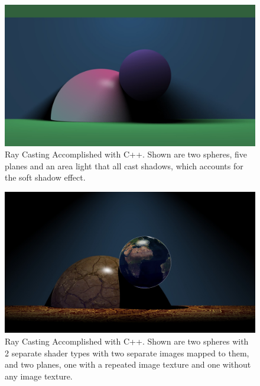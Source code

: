 \begin{figure}[ht]
\centering
\includegraphics[width=\textwidth]{figures/ShadowCastingC++.jpeg}
\caption{Ray Casting Accomplished with C++.  Shown are two spheres, five planes and an area light that all cast shadows, which accounts for the soft shadow effect. }
\label{fig:cplusraycasting}
\end{figure}

\begin{figure}[ht]
\centering
\includegraphics[width=\textwidth]{figures/texturingC++.jpg}
\caption{Ray Casting Accomplished with C++.  Shown are two spheres with 2 separate shader types with two separate images mapped to them, and two planes, one with a repeated image texture and one without any image texture. }
\label{fig:cplusraycasting}
\end{figure}

